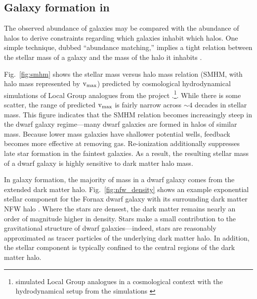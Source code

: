 \subsection{\texorpdfstring{Galaxy formation in
\LCDM{}}{Galaxy formation in }}\label{sec:galaxy_formation}

The observed abundance of galaxies may be compared with the abundance of
\LCDM{} halos to derive constraints regarding which galaxies inhabit
which halos. One simple technique, dubbed ``abundance matching,''
implies a tight relation between the stellar mass of a galaxy and the
mass of the halo it inhabits
\citep{li+white2009, moster+naab+white2013}.

Fig.~\ref{fig:smhm} shows the stellar mass versus halo mass relation
(SMHM, with halo mass represented by \({\rm v}_{\rm max}\)) predicted by \LCDM{}
cosmological hydrodynamical simulations of Local Group analogues from
the \apostle{} project \citep{sawala+2016}.\footnote{\apostle{}
  simulated Local Group analogues in a \LCDM{} cosmological context with
  the hydrodynamical setup from the \eagle{} simulations
  \citep{crain+2015, schaye+2015}}. While there is some scatter, the
range of predicted \({\rm v}_{\rm max}\) is fairly narrow across \(\sim 4\) decades
in stellar mass. This figure indicates that the SMHM relation becomes
increasingly steep in the dwarf galaxy regime---many dwarf galaxies are
formed in halos of similar mass. Because lower mass galaxies have
shallower potential wells, feedback becomes more effective at removing
gas. Re-ionization additionally suppresses late star formation in the
faintest galaxies. As a result, the resulting stellar mass of a dwarf
galaxy is highly sensitive to dark matter halo mass.

In \LCDM{} galaxy formation, the majority of mass in a dwarf galaxy
comes from the extended dark matter halo. Fig.~\ref{fig:nfw_density}
shows an example exponential stellar component for the Fornax dwarf
galaxy with its surrounding dark matter NFW halo \citep[with parameters
matching the][ and \citet{fattahi+2018} relations]{ludlow+2016}. Where
the stars are densest, the dark matter remains nearly an order of
magnitude higher in density. Stars make a small contribution to the
gravitational structure of dwarf galaxies---indeed, stars are reasonably
approximated as tracer particles of the underlying dark matter halo. In
addition, the stellar component is typically confined to the central
regions of the dark matter halo.

